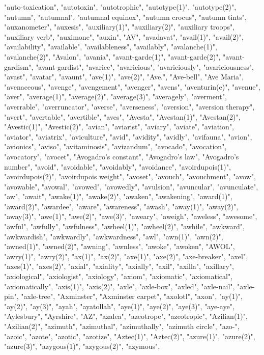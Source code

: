 "auto-toxication",
"autotoxin",
"autotrophic",
"autotype(1)",
"autotype(2)",
"autumn",
"autumnal",
"autumnal equinox",
"autumn crocus",
"autumn tints",
"auxanometer",
"auxesis",
"auxiliary(1)",
"auxiliary(2)",
"auxiliary troops",
"auxiliary verb",
"auximone",
"auxin",
"AV",
"avadavat",
"avail(1)",
"avail(2)",
"availability",
"available",
"availableness",
"availably",
"avalanche(1)",
"avalanche(2)",
"Avalon",
"avania",
"avant-garde(1)",
"avant-garde(2)",
"avant-gardism",
"avant-gardist",
"avarice",
"avaricious",
"avariciously",
"avariciousness",
"avast",
"avatar",
"avaunt",
"ave(1)",
"ave(2)",
"Ave.",
"Ave-bell",
"Ave Maria",
"avenaceous",
"avenge",
"avengement",
"avenger",
"avens",
"aventurin(e)",
"avenue",
"aver",
"average(1)",
"average(2)",
"average(3)",
"averagely",
"averment",
"averrable",
"averruncator",
"averse",
"averseness",
"aversion",
"aversion therapy",
"avert",
"avertable",
"avertible",
"aves",
"Avesta",
"Avestan(1)",
"Avestan(2)",
"Avestic(1)",
"Avestic(2)",
"avian",
"aviarist",
"aviary",
"aviate",
"aviation",
"aviator",
"aviatrix",
"aviculture",
"avid",
"avidity",
"avidly",
"avifauna",
"avion",
"avionics",
"aviso",
"avitaminosis",
"avizandum",
"avocado",
"avocation",
"avocatory",
"avocet",
"Avogadro's constant",
"Avogadro's law",
"Avogadro's number",
"avoid",
"avoidable",
"avoidably",
"avoidance",
"avoirdupois(1)",
"avoirdupois(2)",
"avoirdupois weight",
"avoset",
"avouch",
"avouchment",
"avow",
"avowable",
"avowal",
"avowed",
"avowedly",
"avulsion",
"avuncular",
"avunculate",
"aw",
"await",
"awake(1)",
"awake(2)",
"awaken",
"awakening",
"award(1)",
"award(2)",
"awardee",
"aware",
"awareness",
"awash",
"away(1)",
"away(2)",
"away(3)",
"awe(1)",
"awe(2)",
"awe(3)",
"aweary",
"aweigh",
"aweless",
"awesome",
"awful",
"awfully",
"awfulness",
"awheel(1)",
"awheel(2)",
"awhile",
"awkward",
"awkwardish",
"awkwardly",
"awkwardness",
"awl",
"awn(1)",
"awn(2)",
"awned(1)",
"awned(2)",
"awning",
"awnless",
"awoke",
"awoken",
"AWOL",
"awry(1)",
"awry(2)",
"ax(1)",
"ax(2)",
"axe(1)",
"axe(2)",
"axe-breaker",
"axel",
"axes(1)",
"axes(2)",
"axial",
"axiality",
"axially",
"axil",
"axilla",
"axillary",
"axiological",
"axiologist",
"axiology",
"axiom",
"axiomatic",
"axiomatical",
"axiomatically",
"axis(1)",
"axis(2)",
"axle",
"axle-box",
"axled",
"axle-nail",
"axle-pin",
"axle-tree",
"Axminster",
"Axminster carpet",
"axolotl",
"axon",
"ay(1)",
"ay(2)",
"ay(3)",
"ayah",
"ayatollah",
"aye(1)",
"aye(2)",
"aye(3)",
"aye-aye",
"Aylesbury",
"Ayrshire",
"AZ",
"azalea",
"azeotrope",
"azeotropic",
"Azilian(1)",
"Azilian(2)",
"azimuth",
"azimuthal",
"azimuthally",
"azimuth circle",
"azo-",
"azoic",
"azote",
"azotic",
"azotize",
"Aztec(1)",
"Aztec(2)",
"azure(1)",
"azure(2)",
"azure(3)",
"azygous(1)",
"azygous(2)",
"azymous",
